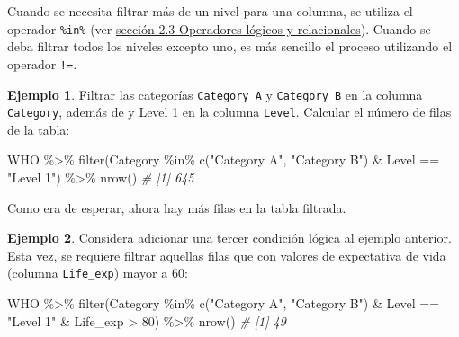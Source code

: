 \documentclass[
]{article}
\newenvironment{Shaded}{\begin{snugshade}}{\end{snugshade}}
\newcommand{\CommentTok}[1]{\textcolor[rgb]{0.56,0.35,0.01}{\textit{#1}}}
\newcommand{\DecValTok}[1]{\textcolor[rgb]{0.00,0.00,0.81}{#1}}
\newcommand{\FunctionTok}[1]{\textcolor[rgb]{0.00,0.00,0.00}{#1}}
\newcommand{\NormalTok}[1]{#1}
\newcommand{\SpecialCharTok}[1]{\textcolor[rgb]{0.00,0.00,0.00}{#1}}
\newcommand{\StringTok}[1]{\textcolor[rgb]{0.31,0.60,0.02}{#1}}
\theoremstyle{definition}
\theoremstyle{definition}
\newtheorem{example}{Ejemplo}[section]
\theoremstyle{definition}
\theoremstyle{definition}
\theoremstyle{remark}
\begin{document}
Cuando se necesita filtrar más de un nivel para una columna, se utiliza el operador \texttt{\%in\%} (ver \protect\hyperlink{operadores-luxf3gicos-y-relacionales}{sección 2.3 Operadores lógicos y relacionales}). Cuando se deba filtrar todos los niveles excepto uno, es más sencillo el proceso utilizando el operador \texttt{!=}.

\begin{example}

Filtrar las categorías \texttt{Category\ A} y \texttt{Category\ B} en la columna \texttt{Category}, además de y Level 1 en la columna \texttt{Level}. Calcular el número de filas de la tabla:

\begin{Shaded}
\begin{Highlighting}[]
\NormalTok{WHO }\SpecialCharTok{\%\textgreater{}\%} 
  \FunctionTok{filter}\NormalTok{(Category }\SpecialCharTok{\%in\%} \FunctionTok{c}\NormalTok{(}\StringTok{"Category A"}\NormalTok{, }\StringTok{"Category B"}\NormalTok{) }\SpecialCharTok{\&}\NormalTok{ Level }\SpecialCharTok{==} \StringTok{"Level 1"}\NormalTok{) }\SpecialCharTok{\%\textgreater{}\%} 
  \FunctionTok{nrow}\NormalTok{()}
\CommentTok{\# [1] 645}
\end{Highlighting}
\end{Shaded}

\end{example}

Como era de esperar, ahora hay más filas en la tabla filtrada.

\begin{example}

Considera adicionar una tercer condición lógica al ejemplo anterior. Esta vez, se requiere filtrar aquellas filas que con valores de expectativa de vida (columna \texttt{Life\_exp}) mayor a 60:

\begin{Shaded}
\begin{Highlighting}[]
\NormalTok{WHO }\SpecialCharTok{\%\textgreater{}\%} 
  \FunctionTok{filter}\NormalTok{(Category }\SpecialCharTok{\%in\%} \FunctionTok{c}\NormalTok{(}\StringTok{"Category A"}\NormalTok{, }\StringTok{"Category B"}\NormalTok{) }\SpecialCharTok{\&}\NormalTok{ Level }\SpecialCharTok{==} \StringTok{"Level 1"} \SpecialCharTok{\&}\NormalTok{ Life\_exp }\SpecialCharTok{\textgreater{}} \DecValTok{80}\NormalTok{) }\SpecialCharTok{\%\textgreater{}\%} 
  \FunctionTok{nrow}\NormalTok{()}
\CommentTok{\# [1] 49}
\end{Highlighting}
\end{Shaded}

\end{example}
\end{document}
